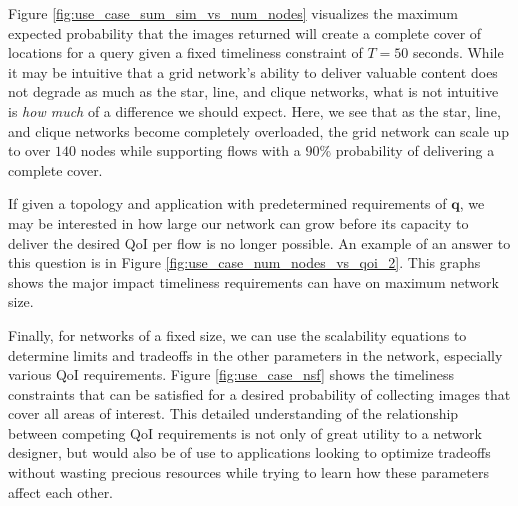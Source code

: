 
Figure \ref{fig:use_case_sum_sim_vs_num_nodes} visualizes the maximum expected probability that the images returned will create a complete cover of locations for a query given a fixed timeliness constraint of $T=50$ seconds. 
While it may be intuitive that a grid network's ability to deliver valuable content does not degrade as much as the star, line, and clique networks, what is not intuitive is \emph{how much} of a difference we should expect. Here, we see that as the star, line, and clique networks become completely overloaded, the grid network can scale up to over $140$ nodes while supporting flows with a $90\%$ probability of delivering a complete cover.

If given a topology and application with predetermined requirements of $\mathbf{q}$, we may be interested in how large our network can grow before its capacity to deliver the desired QoI per flow is no longer possible. An example of an answer to this question is in Figure \ref{fig:use_case_num_nodes_vs_qoi_2}.  This graphs shows the major impact timeliness requirements can have on maximum network size.

{\color{blue}Finally, for networks of a fixed size, we can use the scalability equations to determine limits and tradeoffs in the other parameters in the network, especially various QoI requirements. Figure \ref{fig:use_case_nsf} shows the timeliness constraints that can be satisfied for a desired probability of collecting images that cover all areas of interest. This detailed understanding of the relationship between competing QoI requirements is not only of great utility to a network designer, but would also be of use to applications looking to optimize tradeoffs without wasting precious resources while trying to learn how these parameters affect each other. }

